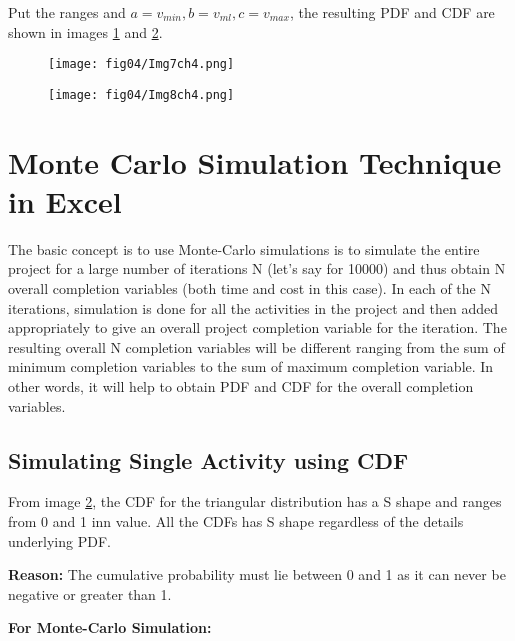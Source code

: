Put the ranges and $ a = v_{min}, b = v_{ml}, c = v_{max}$, the resulting PDF and CDF are shown in images \ref{img7ch4} and \ref{img8ch4}.   

\begin{figure}
	\centering
	\texttt{[image: fig04/Img7ch4.png]}
	\label{img7ch4}
\end{figure}

\begin{figure}
	\centering
	\texttt{[image: fig04/Img8ch4.png]}
	\label{img8ch4}
\end{figure}


\section{Monte Carlo Simulation Technique in Excel}

The basic concept is to use Monte-Carlo simulations is to simulate the entire project for a large number of iterations N (let's say for 10000) and thus obtain N overall completion variables (both time and cost in this case). In each of the N iterations, simulation is done for all the activities in the project and then added appropriately to give an overall project completion variable for the iteration. The resulting overall N completion variables will be different ranging from the sum of minimum completion variables to the sum of maximum completion variable. In other words, it will help to obtain PDF and CDF for the overall completion variables.


\subsection{Simulating Single Activity using CDF}
\label{4.5.1}
From image \ref{img8ch4}, the CDF for the triangular distribution has a S shape and ranges from 0 and 1 inn value. All the CDFs has S shape regardless of the details underlying PDF.

\textbf{Reason:} The cumulative probability must lie between 0 and 1 as it can never be negative or greater than 1.

\textbf{For Monte-Carlo Simulation:}

